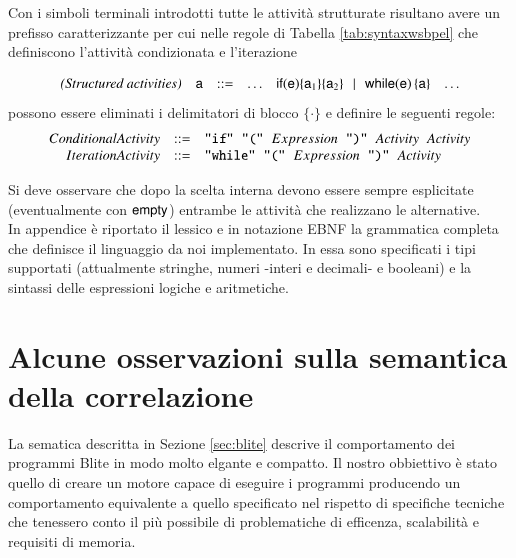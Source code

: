 Con i simboli terminali introdotti tutte le attività strutturate risultano
avere un prefisso caratterizzante per cui nelle regole di Tabella
\ref{tab:syntaxwsbpel} che definiscono l'attività condizionata e l'iterazione  

$$
\begin{array}{rccccl}
\textit{(Structured activities)} & \xs & ::= & \ldots  &
\xif{\xe}{\xs_1}{\xs_2} \!\sepgr\! \xwhile{\xe}{\xs} & \ldots
\end{array}
$$ 
possono essere eliminati i delimitatori di blocco $\{\cdot \}$ e definire le
seguenti regole: $$
\begin{array}{rcl}
ConditionalActivity & ::= & \verb#"if"# \hspace{0.2cm} \verb#"("#
\hspace{0.2cm} Expression \hspace{0.2cm} \verb#")"#  \hspace{0.2cm} Activity
\hspace{0.2cm} Activity \\

IterationActivity & ::= & \verb#"while"# \hspace{0.2cm} \verb#"("#
\hspace{0.2cm} Expression \hspace{0.2cm} \verb#")"#  \hspace{0.2cm} Activity \\
\end{array}
$$

Si deve osservare che dopo la scelta interna devono essere sempre esplicitate
(eventualmente con ${\sf empty}$) entrambe le attività che realizzano le
alternative.
\\

In appendice è riportato il lessico e in notazione EBNF la grammatica completa
che definisce il linguaggio da noi implementato. In essa sono specificati
i tipi supportati (attualmente stringhe, numeri -interi e decimali- e booleani)
e la sintassi delle espressioni logiche e aritmetiche.

\section{Alcune osservazioni sulla semantica della correlazione}
\label{sec:semcor}

La sematica descritta in Sezione \ref{sec:blite} descrive il comportamento dei
programmi Blite in modo molto elgante e compatto. Il nostro obbiettivo è stato
quello di creare un motore capace di eseguire i programmi producendo un
comportamento equivalente a quello specificato nel rispetto di specifiche
tecniche che tenessero conto il più possibile di problematiche di efficenza,
scalabilità e requisiti di memoria.


